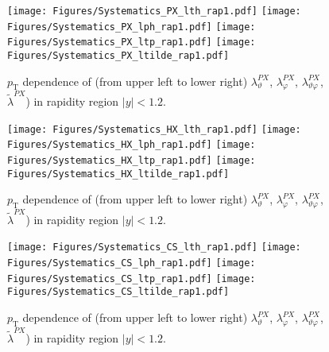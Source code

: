 \documentclass[12pt]{article}
\newcommand{\pT}{p_\mathrm{T}}
\newcommand{\absy}{\left |  y \right |}
\newcommand{\lamthPX}{\lambda^{\scriptscriptstyle PX}_\vartheta}
\newcommand{\lamphPX}{\lambda^{\scriptscriptstyle PX}_\varphi}
\newcommand{\lamthphPX}{\lambda^{\scriptscriptstyle PX}_{\vartheta \varphi}}
\newcommand{\lamtildePX}{\tilde{\lambda}^{\scriptscriptstyle PX}}
\begin{document}



\begin{figure}[htbp]
\centering
\texttt{[image: Figures/Systematics\_PX\_lth\_rap1.pdf]}
\texttt{[image: Figures/Systematics\_PX\_lph\_rap1.pdf]}
\texttt{[image: Figures/Systematics\_PX\_ltp\_rap1.pdf]}
\texttt{[image: Figures/Systematics\_PX\_ltilde\_rap1.pdf]}
\caption{$\pT$ dependence of (from upper left to lower right) $\lamthPX$,
  $\lamphPX$, $\lamthphPX$, $\lamtildePX$) in rapidity region $\absy<1.2$.}
\end{figure}
\clearpage







\begin{figure}[htbp]
\centering
\texttt{[image: Figures/Systematics\_HX\_lth\_rap1.pdf]}
\texttt{[image: Figures/Systematics\_HX\_lph\_rap1.pdf]}
\texttt{[image: Figures/Systematics\_HX\_ltp\_rap1.pdf]}
\texttt{[image: Figures/Systematics\_HX\_ltilde\_rap1.pdf]}
\caption{$\pT$ dependence of (from upper left to lower right) $\lamthPX$,
  $\lamphPX$, $\lamthphPX$, $\lamtildePX$) in rapidity region $\absy<1.2$.}
\end{figure}
\clearpage






\begin{figure}[htbp]
\centering
\texttt{[image: Figures/Systematics\_CS\_lth\_rap1.pdf]}
\texttt{[image: Figures/Systematics\_CS\_lph\_rap1.pdf]}
\texttt{[image: Figures/Systematics\_CS\_ltp\_rap1.pdf]}
\texttt{[image: Figures/Systematics\_CS\_ltilde\_rap1.pdf]}
\caption{$\pT$ dependence of (from upper left to lower right) $\lamthPX$,
  $\lamphPX$, $\lamthphPX$, $\lamtildePX$) in rapidity region $\absy<1.2$.}
\end{figure}
\clearpage
\end{document}

